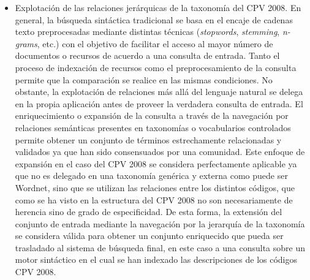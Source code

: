 \begin{itemize}
\item Explotación de las relaciones jerárquicas de la taxonomía del CPV 2008. En general, la búsqueda sintáctica 
tradicional se basa en el encaje de cadenas texto preprocesadas mediante distintas técnicas (\textit{stopwords}, 
\textit{stemming}, \textit{n-grams}, etc.) con el objetivo de facilitar el acceso al mayor número de documentos 
o recursos de acuerdo a una consulta de entrada. Tanto el proceso de indexación de recursos como el preprocesamiento 
de la consulta permite que la comparación se realice en las mismas condiciones. No obstante, la explotación de relaciones 
más allá del lenguaje natural se delega en la propia aplicación antes de proveer la verdadera consulta de entrada. El enriquecimiento 
o expansión de la consulta a través de la navegación por relaciones semánticas presentes en taxonomías o vocabularios 
controlados permite obtener un conjunto de términos estrechamente relacionadas y validados ya que han sido consensuados 
por una comunidad. Este enfoque de expansión en el caso del CPV 2008 se considera perfectamente aplicable ya que no 
es delegado en una taxonomía genérica y externa como puede ser Wordnet, sino que se utilizan las relaciones 
entre los distintos códigos, que como se ha visto en la estructura del CPV 2008 no son necesariamente de 
herencia sino de grado de especificidad. De esta forma, la extensión del conjunto de entrada mediante la navegación 
por la jerarquía de la taxonomía se considera válida para obtener un conjunto enriquecido que pueda ser 
trasladado al sistema de búsqueda final, en este caso a una consulta sobre un motor sintáctico 
en el cual se han indexado las descripciones de los códigos CPV 2008.


\end{itemize}
